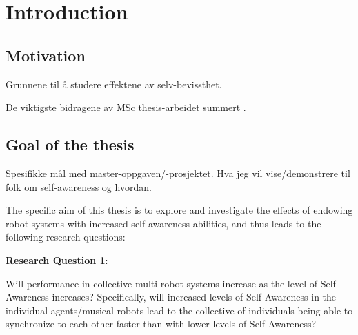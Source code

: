 \chapter{Introduction}
\label{chap:introduction}
	
	
	
	
	
	
	
	
	\section{Motivation}
	
	Grunnene til å studere effektene av selv-bevissthet.
	\nl
	
	De viktigste bidragene av MSc thesis-arbeidet summert .
	
	
	
	
	
	
	
	
	
	\section{Goal of the thesis}
	
	Spesifikke mål  med master-oppgaven/-prosjektet. Hva jeg vil vise/demonstrere til folk  om self-awareness  og hvordan.
	\nl
	
	The specific aim of this thesis is to explore and investigate the effects of endowing robot systems with increased self-awareness abilities, and thus leads to the following research questions:
	
	\textbf{Research Question 1}:
	
	Will performance in collective multi-robot systems increase as the level of Self-Awareness increases? Specifically, will increased levels of Self-Awareness in the individual agents/musical robots lead to the collective of individuals being able to synchronize to each other faster than with lower levels of Self-Awareness? \nl
	
